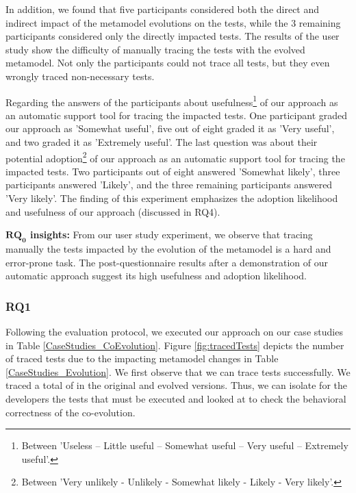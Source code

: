 {	In addition, we found that five participants considered both the direct and indirect impact of the metamodel evolutions on the tests, while the 3 remaining participants considered only the directly impacted tests. 
	The results of the user study show the difficulty of manually tracing the tests with the evolved metamodel. Not only the participants could not trace all tests, but they even wrongly traced non-necessary tests. 
	
	Regarding the answers of the participants about usefulness\footnote{Between 'Useless – Little useful – Somewhat useful – Very useful – Extremely useful'.} of our approach as an automatic support tool for tracing the impacted tests. One participant graded our approach as 'Somewhat useful', five out of eight graded it as 'Very useful', and two graded it as 'Extremely useful'. The last question was about their potential adoption\footnote{Between 'Very unlikely - Unlikely - Somewhat likely - Likely - Very likely'.}%
	of our approach as an automatic support tool for tracing the impacted tests. Two participants out of eight answered 'Somewhat likely', three participants answered 'Likely', and the three remaining participants answered 'Very likely'. The finding of this experiment emphasizes the adoption likelihood and usefulness of our approach (discussed in RQ4).
	
	\begin{tcolorbox}[boxsep=-2pt]
		\textbf{$\boldsymbol{RQ_0}$ insights:}
		From our user study experiment, we observe that tracing manually the tests impacted by the evolution of the metamodel is a hard and error-prone task. The post-questionnaire results after a demonstration of our automatic approach suggest its high usefulness and adoption likelihood.
	\end{tcolorbox}
	
}

\subsubsection{RQ1}

Following the evaluation protocol, we executed our approach on our case studies in Table \ref{CaseStudies_CoEvolution}. Figure \ref{fig:tracedTests} depicts the number of traced tests due to the impacting metamodel changes in Table \ref{CaseStudies_Evolution}. We first observe that we can trace tests successfully. We traced a total of  in the original and evolved versions. Thus, we can isolate for the developers the tests that must be executed and looked at to check the behavioral correctness of the co-evolution. 

